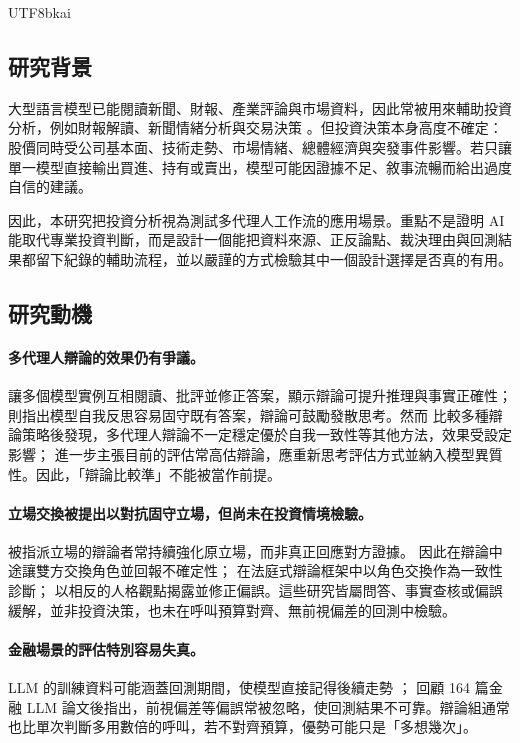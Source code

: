 \documentclass[12pt,a4paper]{article}
\begin{document}
\begin{CJK}{UTF8}{bkai}
\subsection{研究背景}

大型語言模型已能閱讀新聞、財報、產業評論與市場資料，因此常被用來輔助投資分析，例如財報解讀、新聞情緒分析與交易決策 \citep{lopezlira2023chatgpt,araci2019finbert,liu2023fingpt}。但投資決策本身高度不確定：股價同時受公司基本面、技術走勢、市場情緒、總體經濟與突發事件影響。若只讓單一模型直接輸出買進、持有或賣出，模型可能因證據不足、敘事流暢而給出過度自信的建議。

因此，本研究把投資分析視為測試多代理人工作流的應用場景。重點不是證明 AI 能取代專業投資判斷，而是設計一個能把資料來源、正反論點、裁決理由與回測結果都留下紀錄的輔助流程，並以嚴謹的方式檢驗其中一個設計選擇是否真的有用。

\subsection{研究動機}

\paragraph{多代理人辯論的效果仍有爭議。}
\citet{du2023debate} 讓多個模型實例互相閱讀、批評並修正答案，顯示辯論可提升推理與事實正確性；\citet{liang2023divergent} 則指出模型自我反思容易固守既有答案，辯論可鼓勵發散思考。然而 \citet{smit2023mad} 比較多種辯論策略後發現，多代理人辯論不一定穩定優於自我一致性等其他方法，效果受設定影響；\citet{zhang2025stop} 進一步主張目前的評估常高估辯論，應重新思考評估方式並納入模型異質性。因此，「辯論比較準」不能被當作前提。

\paragraph{立場交換被提出以對抗固守立場，但尚未在投資情境檢驗。}
被指派立場的辯論者常持續強化原立場，而非真正回應對方證據。\citet{liu2025roleswitch} 因此在辯論中途讓雙方交換角色並回報不確定性；\citet{chowdhury2026proclaim} 在法庭式辯論框架中以角色交換作為一致性診斷；\citet{chen2026mpt} 以相反的人格觀點揭露並修正偏誤。這些研究皆屬問答、事實查核或偏誤緩解，並非投資決策，也未在呼叫預算對齊、無前視偏差的回測中檢驗。

\paragraph{金融場景的評估特別容易失真。}
LLM 的訓練資料可能涵蓋回測期間，使模型直接記得後續走勢 \citep{glasserman2023lookahead}；\citet{kong2026bias} 回顧 164 篇金融 LLM 論文後指出，前視偏差等偏誤常被忽略，使回測結果不可靠。辯論組通常也比單次判斷多用數倍的呼叫，若不對齊預算，優勢可能只是「多想幾次」。


\end{CJK}
\end{document}
